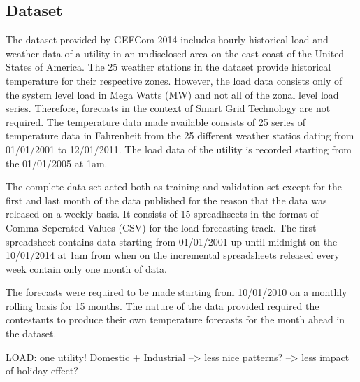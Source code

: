 \documentclass[conference]{IEEEtran}
\begin{document}
\subsection{Dataset}
The dataset provided by GEFCom 2014 includes hourly historical load and weather data of a utility in an undisclosed area on the east coast of the United States of America. The 25 weather stations in the dataset provide historical temperature for their respective zones. However, the load data consists only of the system level load in Mega Watts (MW) and not all of the zonal level load series. Therefore, forecasts in the context of Smart Grid Technology are not required. The temperature data made available consists of 25 series of temperature data in Fahrenheit from the 25 different weather statios dating from 01/01/2001 to 12/01/2011. The load data of the utility is recorded starting from the 01/01/2005 at 1am.\par
The complete data set acted both as training and validation set except for the first and last month of the data published for the reason that the data was released on a weekly basis. It consists of 15 spreadhseets in the format of Comma-Seperated Values (CSV) for the load forecasting track. The first spreadsheet contains data starting from 01/01/2001 up until midnight on the 10/01/2014 at 1am from when on the incremental spreadsheets released every week contain only one month of data.\par
The forecasts were required to be made starting from 10/01/2010 on a monthly rolling basis for 15 months. The nature of the data provided required the contestants to produce their own temperature forecasts for the month ahead in the dataset.\par

LOAD: one utility! Domestic + Industrial --> less nice patterns? --> less impact of holiday effect?

%
\end{document}
